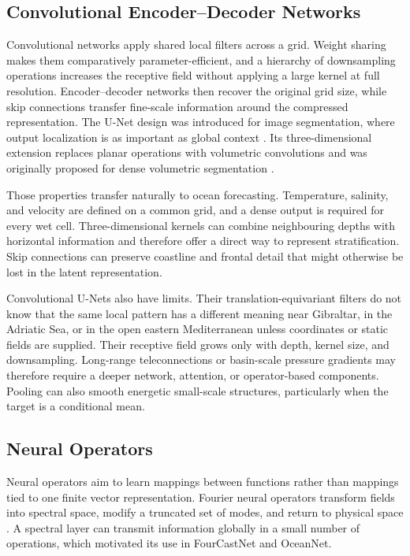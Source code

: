 \subsection{Convolutional Encoder--Decoder Networks}

Convolutional networks apply shared local filters across a grid. Weight sharing makes them comparatively parameter-efficient, and a hierarchy of downsampling operations increases the receptive field without applying a large kernel at full resolution. Encoder--decoder networks then recover the original grid size, while skip connections transfer fine-scale information around the compressed representation. The U-Net design was introduced for image segmentation, where output localization is as important as global context \citep{ronneberger2015unet}. Its three-dimensional extension replaces planar operations with volumetric convolutions and was originally proposed for dense volumetric segmentation \citep{cicek20163dunet}.

Those properties transfer naturally to ocean forecasting. Temperature, salinity, and velocity are defined on a common grid, and a dense output is required for every wet cell. Three-dimensional kernels can combine neighbouring depths with horizontal information and therefore offer a direct way to represent stratification. Skip connections can preserve coastline and frontal detail that might otherwise be lost in the latent representation.

Convolutional U-Nets also have limits. Their translation-equivariant filters do not know that the same local pattern has a different meaning near Gibraltar, in the Adriatic Sea, or in the open eastern Mediterranean unless coordinates or static fields are supplied. Their receptive field grows only with depth, kernel size, and downsampling. Long-range teleconnections or basin-scale pressure gradients may therefore require a deeper network, attention, or operator-based components. Pooling can also smooth energetic small-scale structures, particularly when the target is a conditional mean.

\subsection{Neural Operators}

Neural operators aim to learn mappings between functions rather than mappings tied to one finite vector representation. Fourier neural operators transform fields into spectral space, modify a truncated set of modes, and return to physical space \citep{li2021fno}. A spectral layer can transmit information globally in a small number of operations, which motivated its use in FourCastNet and OceanNet.

